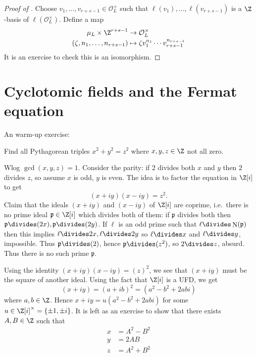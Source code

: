 \documentclass[a4paper]{article}
\renewcommand*{\O}{\mathcal{O}}
\DeclareMathOperator{\n}{N}
\begin{document}
\begin{proof}[Proof of ]
  Choose \(v_1, \dots, v_{r + s - 1} \in \O_L^\times\) such that \(\ell(v_1), \dots, \ell(v_{r + s - 1})\) is a \(\Z\)-basis of \(\ell(\O_L^\times)\). Define a map
  \begin{align*}
    \mu_L \times \Z^{r + s - 1} &\to \O_L^\times \\
    (\zeta, n_1, \dots, n_{r + s - 1}) &\mapsto \zeta v_1^{n_1} \cdots v_{r + s - 1}^{n_{r + s - 1}}
  \end{align*}
  It is an exercise to check this is an isomorphism.
\end{proof}

\section{Cyclotomic fields and the Fermat equation}

An warm-up exercise:

\begin{question}
  Find all Pythagorean triples \(x^2 + y^2 = z^2\) where \(x, y, z \in \Z\) not all zero.
\end{question}

Wlog \(\gcd(x, y, z) = 1\). Consider the parity: if \(2\) divides both \(x\) and \(y\) then \(2\) divides \(z\), so assume \(x\) is odd, \(y\) is even. The idea is to factor the equation in \(\Z[i]\) to get
\[
  (x + iy)(x - iy) = z^2.
\]
Claim that the ideals \((x + iy)\) and \((x - iy)\) of \(\Z[i]\) are coprime, i.e.\ there is no prime ideal \(\mathfrak p \in \Z[i]\) which divides both of them: if \(\mathfrak p\) divides both then \(\mathfrak p \divides (2x), \mathfrak p \divides (2y)\). If \(\ell\) is an odd prime such that \(\ell \divides \n(\mathfrak p)\) then this implies \(\ell \divides 2x, \ell \divides 2y\) so \(\ell \divides x\) and \(\ell \divides y\), impossible. Thus \(\mathfrak p \divides (2)\), hence \(\mathfrak p \divides (z^2)\), so \(2 \divides z\), absurd. Thus there is no such prime \(\mathfrak p\).

Using the identity \((x + iy)(x - iy) = (z)^2\), we see that \((x + iy)\) must be the square of another ideal. Using the fact that \(\Z[i]\) is a UFD, we get
\[
  (x + iy) = (a + ib)^2 = (a^2 - b^2 + 2ab i)
\]
where \(a, b \in \Z\). Hence \(x + iy = u(a^2 - b^2 + 2abi)\) for some \(u \in \Z[i]^\times = \{\pm 1, \pm i\}\). It is left as an exercise to show that there exists \(A, B \in \Z\) such that
\begin{align*}
  x &= A^2 - B^2 \\
  y &= 2AB \\
  z &= A^2 + B^2
\end{align*}
\end{document}
